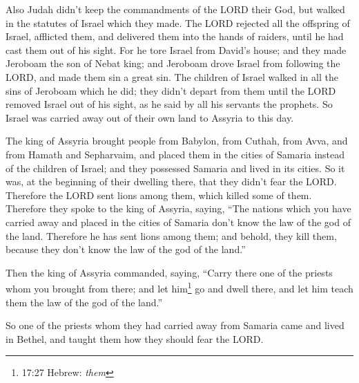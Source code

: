 \myverse{}Also Judah didn’t keep the commandments of the LORD their God,
but walked in the statutes of Israel which they made.
\myverse{}The LORD rejected all the offspring of Israel, afflicted them, and delivered
them into the hands of raiders, until he had cast them out of his sight.
\myverse{}For he tore Israel from David’s house; and they made Jeroboam the son of
Nebat king; and Jeroboam drove Israel from following the LORD, and made them sin a great sin.
\myverse{}The children of Israel walked in all the sins of Jeroboam which he did; they
didn’t depart from them
\myverse{}until the LORD removed Israel out of his sight, as he said by all his servants
the prophets. So Israel was carried away out of their own land to Assyria to this day.

\myverse{}The king of Assyria brought people from Babylon, from Cuthah,
from Avva, and from Hamath and Sepharvaim, and placed them in the cities of Samaria instead of the children
of Israel; and they possessed Samaria and lived in its cities.
\myverse{}So it was, at the beginning of their dwelling there, that they didn’t fear
the LORD. Therefore the LORD sent lions among them, which killed some of them.
\myverse{}Therefore they spoke to the king of Assyria, saying, “The nations which you
have carried away and placed in the cities of Samaria don’t know the law of the god of the land. Therefore
he has sent lions among them; and behold, they kill them, because they don’t know the law of the god of
the land.”

\myverse{}Then the king of Assyria commanded, saying, “Carry there one
of the priests whom you brought from there; and let him\footnote{17:27 Hebrew:
	\textit{them}} go and dwell there, and let him teach them the law of the god of the land.”

\myverse{}So one of the priests whom they had carried away from Samaria
came and lived in Bethel, and taught them how they should fear the LORD.

